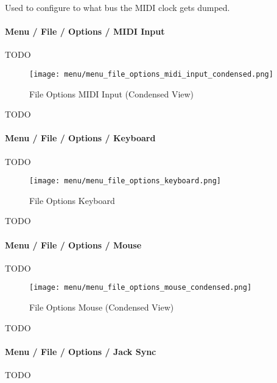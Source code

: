    Used to configure to what bus the MIDI clock gets dumped.

\paragraph{Menu / File / Options / MIDI Input}
\label{paragraph:seq24_menu_file_options_midi_input}

   TODO

\begin{figure}[H]
   \centering 
   \texttt{[image: menu/menu\_file\_options\_midi\_input\_condensed.png]}
   \caption{File Options MIDI Input (Condensed View)}
   \label{fig:seq24_menu_file_options_midi_input}
\end{figure}

   TODO

\paragraph{Menu / File / Options / Keyboard }
\label{paragraph:seq24_menu_file_options_keyboard}

   TODO

\begin{figure}[H]
   \centering 
   \texttt{[image: menu/menu\_file\_options\_keyboard.png]}
   \caption{File Options Keyboard}
   \label{fig:seq24_menu_file_options_keyboard}
\end{figure}

   TODO

\paragraph{Menu / File / Options / Mouse }
\label{paragraph:seq24_menu_file_options_mouse}

   TODO

\begin{figure}[H]
   \centering 
   \texttt{[image: menu/menu\_file\_options\_mouse\_condensed.png]}
   \caption{File Options Mouse (Condensed View)}
   \label{fig:seq24_menu_file_options_mouse}
\end{figure}

   TODO

\paragraph{Menu / File / Options / Jack Sync }
\label{paragraph:seq24_menu_file_options_jack_sync}

   TODO

